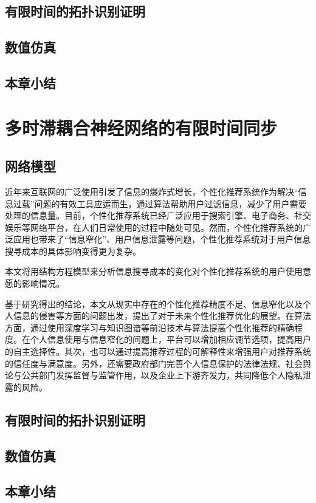 \documentclass[a4paper,zihao=-4,UTF8]{ctexart}
\numberwithin{equation}{section}
\begin{document}
	\subsection{有限时间的拓扑识别证明}
	\subsection{数值仿真}
	\subsection{本章小结}

\section{多时滞耦合神经网络的有限时间同步}
	\subsection{网络模型}
	近年来互联网的广泛使用引发了信息的爆炸式增长，个性化推荐系统作为解决“信息过载”问题的有效工具应运而生，通过算法帮助用户过滤信息，减少了用户需要处理的信息量。目前，个性化推荐系统已经广泛应用于搜索引擎、电子商务、社交娱乐等网络平台，在人们日常使用的过程中随处可见。然而，个性化推荐系统的广泛应用也带来了“信息窄化”、用户信息泄露等问题，个性化推荐系统对于用户信息搜寻成本的具体影响变得更为复杂。
	
	本文将用结构方程模型来分析信息搜寻成本的变化对个性化推荐系统的用户使用意愿的影响情况。
	
	基于研究得出的结论，本文从现实中存在的个性化推荐精度不足、信息窄化以及个人信息的侵害等方面的问题出发，提出了对于未来个性化推荐优化的展望。在算法方面，通过使用深度学习与知识图谱等前沿技术与算法提高个性化推荐的精确程度。在个人信息使用与信息窄化的问题上，平台可以增加相应调节选项，提高用户的自主选择性。其次，也可以通过提高推荐过程的可解释性来增强用户对推荐系统的信任度与满意度。另外，还需要政府部门完善个人信息保护的法律法规、社会舆论与公共部门发挥监督与监管作用，以及企业上下游齐发力，共同降低个人隐私泄露的风险。
	\subsection{有限时间的拓扑识别证明}
	\subsection{数值仿真}
	\subsection{本章小结}
\end{document}
